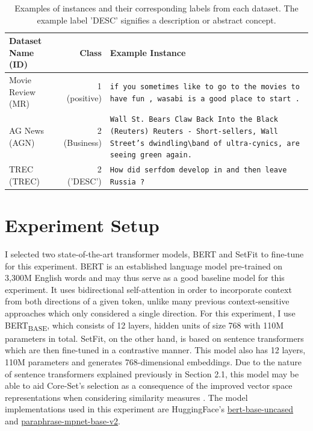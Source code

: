 \documentclass[english,bachelor,ul]{webisthesis} %
\begin{document}
\vspace{1\baselineskip}

\begin{table}[htbp]
    \centering
    \renewcommand{\arraystretch}{1.5}
    \begin{tabular}{@{}lrp{7cm}@{}} 
        \toprule
        \textbf{Dataset Name} \scriptsize (ID) & \textbf{Class} & \textbf{Example Instance} \\
        \midrule
        Movie Review \scriptsize (MR) & 1 (positive) & \texttt{if you sometimes like to go to the movies to have fun , wasabi is a good place to start .} \\
        AG News \scriptsize (AGN) & 2  (Business) & \texttt{Wall St. Bears Claw Back Into the Black (Reuters) Reuters - Short-sellers, Wall Street's dwindling\textbackslash band of ultra-cynics, are seeing green again.} \\
        TREC \scriptsize (TREC) & 2 ('DESC') & \texttt{How did serfdom develop in and then leave Russia ?} \\
        \bottomrule
    \end{tabular}
    \caption{Examples of instances and their corresponding labels from each dataset. The example label 'DESC' signifies a description or abstract concept.}
    \label{tab:dataset-instances}
\end{table}

\newpage 

\section{Experiment Setup}

I selected two state-of-the-art transformer models, BERT \citep{DBLP:conf/naacl/DevlinCLT19} and SetFit \citep{DBLP:setfit} to fine-tune for this experiment. BERT is an established language model pre-trained on 3,300M English words and may thus serve as a good baseline model for this experiment. It uses bidirectional self-attention in order to incorporate context from both directions of a given token, unlike many previous context-sensitive approaches which only considered a single direction. For this experiment, I use BERT\textsubscript{BASE}, which consists of 12 layers, hidden units of size 768 with 110M parameters in total. SetFit, on the other hand, is based on sentence transformers which are then fine-tuned in a contrastive manner. This model also has 12 layers, 110M parameters and generates 768-dimensional embeddings. Due to the nature of sentence transformers explained previously in Section 2.1, this model may be able to aid Core-Set's selection as a consequence of the improved vector space representations when considering similarity measures \citep{DBLP:conf/emnlp/ReimersG19}. The model implementations used in this experiment are HuggingFace's \href{https://huggingface.co/google-bert/bert-base-uncased}{bert-base-uncased} and \href{https://huggingface.co/sentence-transformers/paraphrase-mpnet-base-v2}{
paraphrase-mpnet-base-v2}.
\end{document}
